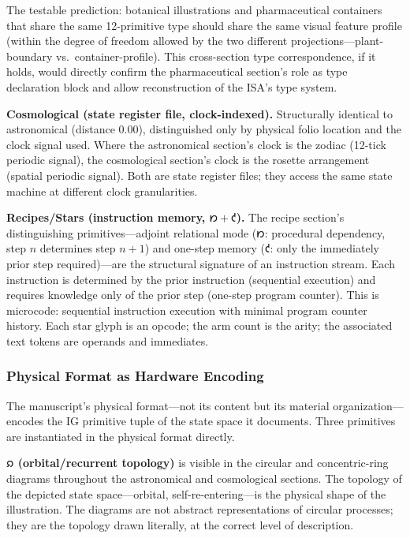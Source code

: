 \documentclass[12pt,a4paper]{article}
\begin{document}
The testable prediction: botanical illustrations and pharmaceutical containers that share the same 12-primitive type should share the same visual feature profile (within the degree of freedom allowed by the two different projections---plant-boundary vs.\ container-profile). This cross-section type correspondence, if it holds, would directly confirm the pharmaceutical section's role as type declaration block and allow reconstruction of the ISA's type system.

\textbf{Cosmological (state register file, clock-indexed).} Structurally identical to astronomical (distance 0.00), distinguished only by physical folio location and the clock signal used. Where the astronomical section's clock is the zodiac (12-tick periodic signal), the cosmological section's clock is the rosette arrangement (spatial periodic signal). Both are state register files; they access the same state machine at different clock granularities.

\textbf{Recipes/Stars (instruction memory, $𐑽 + 𐑒$).} The recipe section's distinguishing primitives---adjoint relational mode ($𐑽$: procedural dependency, step $n$ determines step $n+1$) and one-step memory ($𐑒$: only the immediately prior step required)---are the structural signature of an instruction stream. Each instruction is determined by the prior instruction (sequential execution) and requires knowledge only of the prior step (one-step program counter). This is microcode: sequential instruction execution with minimal program counter history. Each star glyph is an opcode; the arm count is the arity; the associated text tokens are operands and immediates.

\subsubsection{Physical Format as Hardware Encoding}

The manuscript's physical format---not its content but its material organization---encodes the IG primitive tuple of the state space it documents. Three primitives are instantiated in the physical format directly.

\textbf{$𐑸$ (orbital/recurrent topology)} is visible in the circular and concentric-ring diagrams throughout the astronomical and cosmological sections. The topology of the depicted state space---orbital, self-re-entering---is the physical shape of the illustration. The diagrams are not abstract representations of circular processes; they are the topology drawn literally, at the correct level of description.
\end{document}
